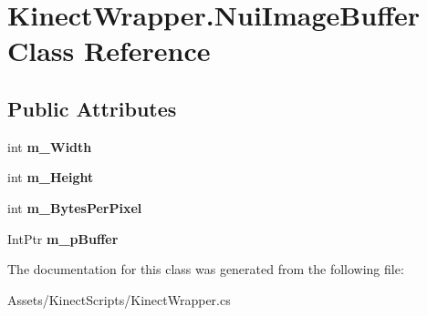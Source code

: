 \hypertarget{class_kinect_wrapper_1_1_nui_image_buffer}{}\section{Kinect\+Wrapper.\+Nui\+Image\+Buffer Class Reference}
\label{class_kinect_wrapper_1_1_nui_image_buffer}
\subsection*{Public Attributes}
\begin{DoxyCompactItemize}
\item 
\mbox{\label{class_kinect_wrapper_1_1_nui_image_buffer_a48b4d97b043d88cf5d17580e36c35e5d}} 
int {\bfseries m\+\_\+\+Width}
\item 
\mbox{\label{class_kinect_wrapper_1_1_nui_image_buffer_afd78a9db6894785383abbe65bb4be9eb}} 
int {\bfseries m\+\_\+\+Height}
\item 
\mbox{\label{class_kinect_wrapper_1_1_nui_image_buffer_a0291ec2dbbb18e55026c4c1e089e92bf}} 
int {\bfseries m\+\_\+\+Bytes\+Per\+Pixel}
\item 
\mbox{\label{class_kinect_wrapper_1_1_nui_image_buffer_ae64fa64cd3f02ac5744ca189ac4570db}} 
Int\+Ptr {\bfseries m\+\_\+p\+Buffer}
\end{DoxyCompactItemize}


The documentation for this class was generated from the following file\+:\begin{DoxyCompactItemize}
\item 
Assets/\+Kinect\+Scripts/Kinect\+Wrapper.\+cs\end{DoxyCompactItemize}
